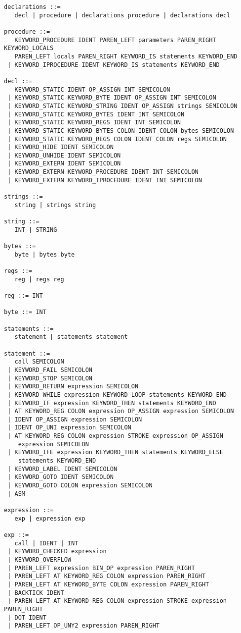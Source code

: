 \begin{verbatim}
declarations ::= 
   decl | procedure | declarations procedure | declarations decl

procedure ::= 
   KEYWORD_PROCEDURE IDENT PAREN_LEFT parameters PAREN_RIGHT KEYWORD_LOCALS 
   PAREN_LEFT locals PAREN_RIGHT KEYWORD_IS statements KEYWORD_END
 | KEYWORD_IPROCEDURE IDENT KEYWORD_IS statements KEYWORD_END

decl ::= 
   KEYWORD_STATIC IDENT OP_ASSIGN INT SEMICOLON 
 | KEYWORD_STATIC KEYWORD_BYTE IDENT OP_ASSIGN INT SEMICOLON 
 | KEYWORD_STATIC KEYWORD_STRING IDENT OP_ASSIGN strings SEMICOLON 
 | KEYWORD_STATIC KEYWORD_BYTES IDENT INT SEMICOLON
 | KEYWORD_STATIC KEYWORD_REGS IDENT INT SEMICOLON 
 | KEYWORD_STATIC KEYWORD_BYTES COLON IDENT COLON bytes SEMICOLON 
 | KEYWORD_STATIC KEYWORD_REGS COLON IDENT COLON regs SEMICOLON
 | KEYWORD_HIDE IDENT SEMICOLON
 | KEYWORD_UNHIDE IDENT SEMICOLON
 | KEYWORD_EXTERN IDENT SEMICOLON
 | KEYWORD_EXTERN KEYWORD_PROCEDURE IDENT INT SEMICOLON
 | KEYWORD_EXTERN KEYWORD_IPROCEDURE IDENT INT SEMICOLON

strings ::= 
   string | strings string

string ::= 
   INT | STRING

bytes ::= 
   byte | bytes byte

regs ::= 
   reg | regs reg

reg ::= INT

byte ::= INT

statements ::= 
   statement | statements statement

statement ::= 
   call SEMICOLON 
 | KEYWORD_FAIL SEMICOLON
 | KEYWORD_STOP SEMICOLON
 | KEYWORD_RETURN expression SEMICOLON
 | KEYWORD_WHILE expression KEYWORD_LOOP statements KEYWORD_END
 | KEYWORD_IF expression KEYWORD_THEN statements KEYWORD_END
 | AT KEYWORD_REG COLON expression OP_ASSIGN expression SEMICOLON
 | IDENT OP_ASSIGN expression SEMICOLON
 | IDENT OP_UNI expression SEMICOLON
 | AT KEYWORD_REG COLON expression STROKE expression OP_ASSIGN 
    expression SEMICOLON
 | KEYWORD_IFE expression KEYWORD_THEN statements KEYWORD_ELSE
    statements KEYWORD_END
 | KEYWORD_LABEL IDENT SEMICOLON
 | KEYWORD_GOTO IDENT SEMICOLON
 | KEYWORD_GOTO COLON expression SEMICOLON
 | ASM

expression ::= 
   exp | expression exp

exp ::= 
   call | IDENT | INT
 | KEYWORD_CHECKED expression
 | KEYWORD_OVERFLOW
 | PAREN_LEFT expression BIN_OP expression PAREN_RIGHT
 | PAREN_LEFT AT KEYWORD_REG COLON expression PAREN_RIGHT
 | PAREN_LEFT AT KEYWORD_BYTE COLON expression PAREN_RIGHT
 | BACKTICK IDENT
 | PAREN_LEFT AT KEYWORD_REG COLON expression STROKE expression PAREN_RIGHT
 | DOT IDENT
 | PAREN_LEFT OP_UNY2 expression PAREN_RIGHT


\end{verbatim}
